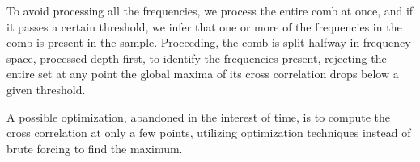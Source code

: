 To avoid processing all the frequencies, we process the entire comb at once, and
if it passes a certain threshold, we infer that one or more of the frequencies
in the comb is present in the sample. Proceeding, the comb is split halfway in
frequency space, processed depth first, to identify the frequencies present,
rejecting the entire set at any point the global maxima of its cross correlation
drops below a given threshold.

A possible optimization, abandoned in the interest of time, is to compute the
cross correlation at only a few points, utilizing optimization techniques
instead of brute forcing to find the maximum.